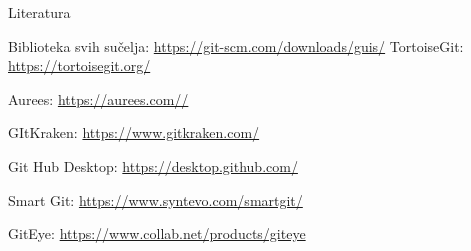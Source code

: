 \documentclass[hyperref={bookmarks=false},aspectratio=169]{beamer}
\begin{document}
\begin{frame}{Literatura}
\printbibliography
\begin{thebibliography}{9}
 Biblioteka svih sučelja:
\url{https://git-scm.com/downloads/guis/}
TortoiseGit:
\url{https://tortoisegit.org/}

 Aurees:
\url{https://aurees.com//}

 GItKraken:
\url{ https://www.gitkraken.com/}

Git Hub Desktop:
\url{https://desktop.github.com/}

 Smart Git:
\url{https://www.syntevo.com/smartgit/}

 GitEye:
\url{https://www.collab.net/products/giteye}

\end{thebibliography}
\end{frame}
\end{document}

